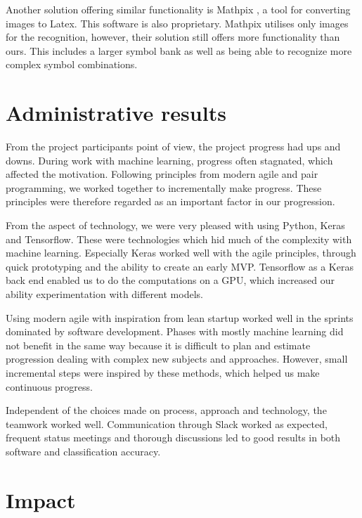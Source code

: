 Another solution offering similar functionality is Mathpix \cite{mathpix_mathpix:_2018}, a tool for converting images to Latex. This software is also proprietary. Mathpix utilises only images for the recognition, however, their solution still offers more functionality than ours. This includes a larger symbol bank as well as being able to recognize more complex symbol combinations.

\section{Administrative results}

From the project participants point of view, the project progress had ups and downs. During work with machine learning, progress often stagnated, which affected the motivation. Following principles from modern agile and pair programming, we worked together to incrementally make progress. These principles were therefore regarded as an important factor in our progression.

From the aspect of technology, we were very pleased with using Python, Keras and Tensorflow. These were technologies which hid much of the complexity with machine learning. Especially Keras worked well with the agile principles, through quick prototyping and the ability to create an early MVP. Tensorflow as a Keras back end enabled us to do the computations on a GPU, which increased our ability experimentation with different models.

Using modern agile with inspiration from lean startup worked well in the sprints dominated by software development. Phases with mostly machine learning did not benefit in the same way because it is difficult to plan and estimate progression dealing with complex new subjects and approaches. However, small incremental steps were inspired by these methods, which helped us make continuous progress.

Independent of the choices made on process, approach and technology, the teamwork worked well. Communication through Slack worked as expected, frequent status meetings and thorough discussions led to good results in both software and classification accuracy.

\section{Impact}

